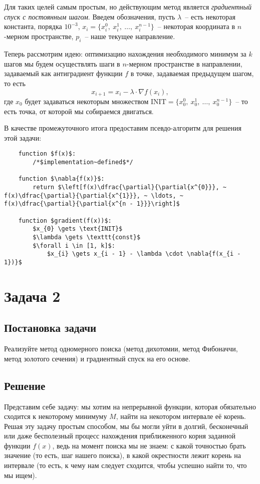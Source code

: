 \documentclass[12pt, a4paper, oneside]{article}
\begin{document}
	Для таких целей самым простым, но действующим метод является \textit{градиентный спуск с постоянным шагом}. 	Введем обозначения, пусть $\lambda$~-- есть некоторая константа, порядка $10^{-3}$, $x_{i} = \{x^{0}_{i}, ~ x^{1}_{i}, ~ \ldots, ~ x^{n - 1}_{i}\}$~-- некоторая координата в $n$-мерном пространстве, $p_{i}$~-- наше текущее направление.

	Теперь рассмотрим идею: оптимизацию нахождения необходимого минимум за $k$ шагов мы будем осуществлять шаги в $n$-мерном пространстве в направлении, задаваемый как антиградиент функции $f$ в точке, задаваемая предыдущем шагом, то есть
	\[
		x_{i + 1} = x_{i} - \lambda \cdot \nabla{f(x_{i})},
	\] где $x_{0}$ будет задаваться некоторым множеством $\text{INIT} = \{x^{0}_{0}, ~ x^{1}_{0}, ~ \ldots, ~ x^{n - 1}_{0}\}$~-- то есть точка, от которой мы собираемся двигаться.

	В качестве промежуточного итога предоставим псевдо-алгоритм для решения этой задачи:
	\begin{lstlisting}
	function $f(x)$:
		/*$implementation~defined$*/
			
	function $\nabla{f(x)}$:
		return $\left[f(x)\dfrac{\partial}{\partial{x^{0}}}, ~ f(x)\dfrac{\partial}{\partial{x^{1}}}, ~ \ldots, ~ f(x)\dfrac{\partial}{\partial{x^{n - 1}}}\right]$
			
	function $gradient(f(x))$:
		$x_{0} \gets \text{INIT}$
		$\lambda \gets \texttt{const}$
		$\forall i \in [1, k]$:
		    $x_{i} \gets x_{i - 1} - \lambda \cdot \nabla{f(x_{i - 1})}$
	\end{lstlisting}
	\section*{Задача 2}
	\subsection*{Постановка задачи}
	Реализуйте метод одномерного поиска (метод дихотомии, метод Фибоначчи, метод золотого сечения) и градиентный спуск на его основе.
	\subsection*{Решение}
	Представим себе задачу: мы хотим на непрерывной функции, которая обязательно сходится к некоторому минимуму $M$, найти на некотором интервале её корень. Решая эту задачу простым способом, мы бы могли уйти в долгий, бесконечный или даже бесполезный процесс нахождения приближенного корня заданной функции $f(x)$, ведь на момент поиска мы не знаем: с какой точностью брать значение (то есть, шаг нашего поиска), в какой окрестности лежит корень на интервале (то есть, к чему нам следует сходится, чтобы успешно найти то, что мы ищем).
\end{document}
